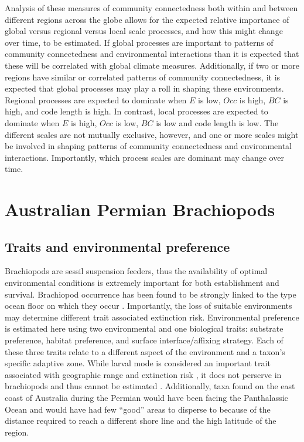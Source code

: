 \documentclass[12pt,letterpaper]{article}
\begin{document}
Analysis of these measures of community connectedness both within and between different regions across the globe allows for the expected relative importance of global versus regional versus local scale processes, and how this might change over time, to be estimated. If global processes are important to patterns of community connectedness and environmental interactions than it is expected that these will be correlated with global climate measures. Additionally, if two or more regions have similar or correlated patterns of community connectedness, it is expected that global processes may play a roll in shaping these environments. Regional processes are expected to dominate when \(E\) is low, \(Occ\) is high, \(BC\) is high, and code length is high. In contrast, local processes are expected to dominate when \(E\) is high, \(Occ\) is low, \(BC\) is low and code length is low. The different scales are not mutually exclusive, however, and one or more scales might be involved in shaping patterns of community connectedness and environmental interactions. Importantly, which process scales are dominant may change over time.

\clearpage

\section{Australian Permian Brachiopods} \label{sec:brac}

\subsection{Traits and environmental preference} \label{sec:bracback}
Brachiopods are sessil suspension feeders, thus the availability of optimal environmental conditions is extremely important for both establishment and survival. Brachiopod occurrence has been found to be strongly linked to the type ocean floor on which they occur \citep{Richardson1997,Richardson1997a}. Importantly, the loss of suitable environments may determine different trait associated extinction risk. Environmental preference is estimated here using two environmental and one biological traits: substrate preference, habitat preference, and surface interface/affixing strategy. Each of these three traits relate to a different aspect of the environment and a taxon's specific adaptive zone. While larval mode is considered an important trait associated with geographic range and extinction risk \citep{Jablonski2006a,Jablonski1983}, it does not perserve in brachiopods and thus cannot be estimated \citep{Jablonski1983}. Additionally, taxa found on the east coast of Australia during the Permian would have been facing the Panthalassic Ocean and would have had few ``good'' areas to disperse to because of the distance required to reach a different shore line and the high latitude of the region.
\end{document}

